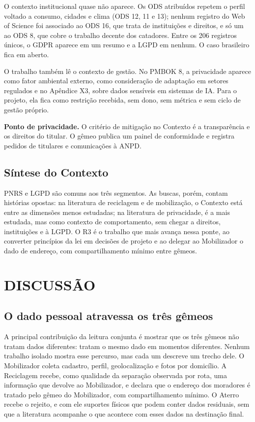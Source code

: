 \documentclass[12pt,a4paper,article,oneside,english,brazil]{abntex2}
\begin{document}
O contexto institucional quase não aparece. Os ODS atribuídos repetem o perfil voltado a consumo, cidades e clima (ODS 12, 11 e 13); nenhum registro do Web of Science foi associado ao ODS 16, que trata de instituições e direitos, e só um ao ODS 8, que cobre o trabalho decente dos catadores. Entre os 206 registros únicos, o GDPR aparece em um resumo e a LGPD em nenhum. O caso brasileiro fica em aberto.

O trabalho também lê o contexto de gestão. No PMBOK 8, a privacidade aparece como fator ambiental externo, como consideração de adaptação em setores regulados e no Apêndice X3, sobre dados sensíveis em sistemas de IA. Para o projeto, ela fica como restrição recebida, sem dono, sem métrica e sem ciclo de gestão próprio.

\textbf{Ponto de privacidade.} O critério de mitigação no Contexto é a transparência e os direitos do titular. O gêmeo publica um painel de conformidade e registra pedidos de titulares e comunicações à ANPD.

\subsection{Síntese do Contexto}

PNRS e LGPD são comuns aos três segmentos. As buscas, porém, contam histórias opostas: na literatura de reciclagem e de mobilização, o Contexto está entre as dimensões menos estudadas; na literatura de privacidade, é a mais estudada, mas como contexto de comportamento, sem chegar a direitos, instituições e à LGPD. O R3 é o trabalho que mais avança nessa ponte, ao converter princípios da lei em decisões de projeto e ao delegar ao Mobilizador o dado de endereço, com compartilhamento mínimo entre gêmeos.

\section{DISCUSSÃO}

\subsection{O dado pessoal atravessa os três gêmeos}

A principal contribuição da leitura conjunta é mostrar que os três gêmeos não tratam dados diferentes: tratam o mesmo dado em momentos diferentes. Nenhum trabalho isolado mostra esse percurso, mas cada um descreve um trecho dele. O Mobilizador coleta cadastro, perfil, geolocalização e fotos por domicílio. A Reciclagem recebe, como qualidade da separação observada por rota, uma informação que devolve ao Mobilizador, e declara que o endereço dos moradores é tratado pelo gêmeo do Mobilizador, com compartilhamento mínimo. O Aterro recebe o rejeito, e com ele suportes físicos que podem conter dados residuais, sem que a literatura acompanhe o que acontece com esses dados na destinação final.
\end{document}
